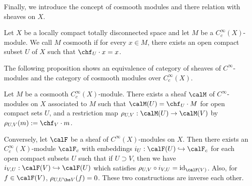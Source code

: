 Finally, we introduce the concept of cosmooth modules and there relation with sheaves on $X$. 
\begin{definition}
Let $X$ be a locally compact totally disconnected space and let $M$ be a $C_{c}^{\infty}(X)$-module. 
We call $M$ cosmooth if for every $x\in M$, there exists an open compact subset $U$ of $X$ such that $\chf_{U} \cdot x = x$. 
\end{definition}
The following proposition shows an equivalence of category of sheaves of $C^{\infty}$-modules and the category of cosmooth modules over $C_{c}^{\infty}(X)$. 
\begin{proposition}
Let $M$ be a cosmooth $C_{c}^{\infty}(X)$-module. There exists a sheaf $\calM$ of $C^{\infty}$-modules on $X$ associated to $M$ such that $\calM(U) = \chf_{U}\cdot M$ for open compact sets $U$, and a restriction map $\rho_{U, V} : \calM(U) \to \calM(V)$ by $\rho_{U, V}(m) := \chf_{V}\cdot m$. 

Conversely, let $\calF$ be a sheaf of $C^{\infty}(X)$-modules on $X$. Then there exists an $C_{c}^{\infty}(X)$-module $\calF_{c}$ with embeddings $i_U : \calF(U) \hookrightarrow \calF_{c}$ for each open compact subsets $U$ such that if $U\supset V$, then we have $i_{V, U} : \calF(V)\hookrightarrow \calF(U)$ which satisfies $\rho_{U, V} \circ i_{V, U} = \mathrm{id}_{\calF(V)}$. 
Also, for $f\in \calF(V)$, $\rho_{U, U\bs V}(f) = 0$. These two constructions are inverse each other. 
\end{proposition}

